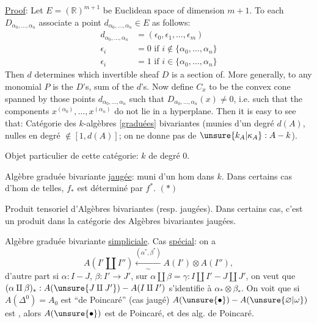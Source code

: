 \uline{Proof}: Let $E=(\mathbb{R})^{m+1}$ be Euclidean space of dimension $m+1$. To each $D_{\alpha_0,\ldots,\alpha_n}$ associate a point $d_{\alpha_0,\ldots,\alpha_n}\in E$ as follows:
\[
\begin{aligned}
d_{\alpha_0,\ldots,\alpha_n}&=(\epsilon_0,\epsilon_1,\ldots,\epsilon_m)\\
\epsilon_i&=0\text{ if }i\notin\{\alpha_0,\ldots,\alpha_n\}\\
\epsilon_i&=1\text{ if }i\in\{\alpha_0,\ldots,\alpha_n\}
\end{aligned}
\]
Then $d$ determines which invertible sheaf $D$ is a section of. More generally, to any monomial $P$ is the $D$'s,  sum of the $d$'s. Now define $C_x$ to be the convex cone spanned by those points $d_{\alpha_0,\ldots,\alpha_n}$ such that $D_{\alpha_0,\ldots,\alpha_n}(x)\ne0$, i.e. such that the components $x^{(\alpha_0)},\ldots,x^{(\alpha_n)}$ do not lie in a hyperplane. Then it is easy to see that:
Catégorie des $k$-algèbres [\uline{graduées}] bivariantes  (munies d'un degré $d(A)$, nulles en degré $\notin[1,d(A)]$; on ne donne pas de $\unsure{k_A|\kappa_A}:A\mathbin{-}k$).

Objet particulier de cette catégorie: $k$ de degré $0$.

Algèbre graduée bivariante \uline{jaugée}: muni d'un hom dans $k$.
Dans certains cas d'hom de telles, $f_*$ est déterminé par $f^*$. $(*)$

Produit tensoriel d'Algèbres bivariantes (resp. jaugées). Dans certains cas, c'est un produit dans la catégorie des Algèbres bivariantes jaugées.

Algèbre graduée bivariante  \uline{simpliciale}.  Cas \uline{spécial}: on a
\[
A(I'\amalg I'')\xleftarrow[\sim]{(\alpha^*,\beta^*)}A(I')\otimes A(I''),
\]
d'autre part si $\alpha:I\mathbin{-}J$, $\beta:I'\longrightarrow J'$, sur $\alpha\amalg\beta=\gamma:I\amalg I'\mathbin{-}J\amalg J'$, on veut que $(\alpha\amalg\beta)_*:A(\unsure{J\amalg J'})\mathbin{-}A(I\amalg I')$ s'identifie à $\alpha_*\otimes\beta_*$. On voit que si $A(\Delta^0)=A_0$ est ``de Poincaré'' (cas jaugé) $A(\unsure{\bullet})\mathbin{-}A(\unsure{\varnothing|\omega})$ est , alors $A(\unsure{\bullet})$ est  de Poincaré, et des alg. de Poincaré.

